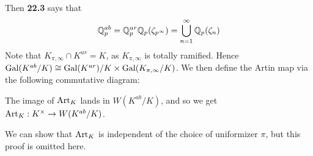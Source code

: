 \documentclass[10pt,a4paper]{article}
\begin{document}
Then \textbf{22.3} says that
\[\mathbb{Q}_p^{ab} = \mathbb{Q}_p^{ur}\mathbb{Q}_p(\zeta_{p^\infty}) = \bigcup_{n=1}^\infty \mathbb{Q}_p(\zeta_n)\]
Note that $K_{\pi, \infty} \cap K^{ur} = K$, as $K_{\pi, \infty}$ is totally ramified. Hence $\operatorname{Gal}(K^{ab}/K) \cong \operatorname{Gal}(K^{ur})/K \times \operatorname{Gal}(K_{\pi, \infty}/K)$. We then define the Artin map via the following commutative diagram:
\begin{center}
\end{center}
The image of $\operatorname{Art}_K$ lands in $W(K^{ab}/K)$, and so we get $\operatorname{Art}_K:K^\times \to W(K^{ab}/K)$.

We can show that $\operatorname{Art}_K$ is independent of the choice of uniformizer $\pi$, but this proof is omitted here.
\end{document}
